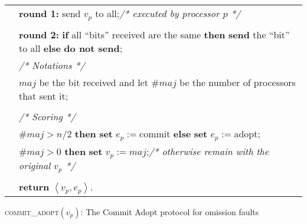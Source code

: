 \documentclass[11pt]{article}
\newcommand{\tri}[1]{\left<#1 \right>}
\newcommand{\tb}{\makebox[0.6cm]{}}
\newcommand{\due}{\makebox[1cm]{}}
\newcommand{\ca}{{\small\textsc{commit\!\_adopt}}\xspace}
\begin{document}
\begin{algorithm}[!ht]
\footnotesize
{}
 \setcounter{AlgoLine}{0}
\begin{tabular}{ r l }
\lnl{line:o-vote1} &  {\bf round 1:}   send $v_p$ to all;\hspace{2.2in}\hfill\textit{/* executed by processor $p$ */}\\
\\
\lnl{line:o-test}&  {\bf round 2:}  {\bf if}  all ``bits'' received are the same  {\bf then} {\bf send} the ``bit'' to all  {\bf else} {\bf do not send};\\
\nl & \tb\due \textit{/* Notations */}\\
\nl & \tb\due {\bf let} $maj$ be the bit received and let $\#maj$ be the number of processors that sent it;\\
\\
\nl &  \textit{/* Scoring */}\\
\lnl{line:o-commit}& \tb {\bf if}  $\#maj> n/2 $ {\bf then} {\bf set}  $e_p := ${\sc commit}  {\bf else} {\bf set}  $e_p := ${\sc adopt};\\
\lnl{line:o-value}& \tb {\bf if} $\#maj>0$ {\bf then} {\bf set}  $v_p :=maj$;\hfill\textit{/* otherwise remain with the original $v_p$ */}\\
\\
\nl & {\bf return} $\tri{v_p,e_p}$.
\end{tabular}
\caption{ \ca\!$(v_p)$: The Commit Adopt protocol for omission faults}\label{figure:ca-omm}
\end{algorithm}
\end{document}

